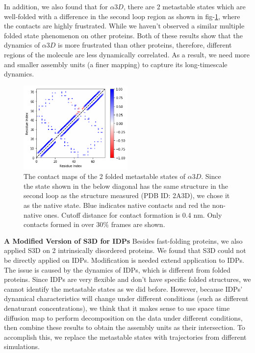 \documentclass[12pt]{article}
\begin{document}
\setlength{\parindent}{2em}

In addition, we also found that for $\alpha 3D$, there are 2 metastable states which are well-folded with a difference in the second loop region as shown in fig-\ref{A3D_contact}, where the contacts are highly frustrated\cite{Justin_frustration}. While we haven't observed a similar multiple folded state phenomenon on other proteins. Both of these results show that the dynamics of $\alpha 3D$ is more frustrated than other proteins, therefore, different regions of the molecule are less dynamically correlated. As a result, we need more and smaller assembly units (a finer mapping) to capture its long-timescale dynamics. 

\begin{figure}[htbp]
  \centering
  \includegraphics[width=0.5\textwidth]{A3D_contact_HMM_5_state_4_contacts.png}
  \caption{\label{A3D_contact}The contact maps of the 2 folded metastable states of $\alpha 3D$. Since the state shown in the below diagonal has the same structure in the second loop as the structure measured (PDB ID: 2A3D), we chose it as the native state. Blue indicates native contacts and red the non-native ones. Cutoff distance for contact formation is 0.4 nm. Only contacts formed in over $30\%$ frames are shown.}
\end{figure}

\setlength{\parindent}{0em}

{\bf A Modified Version of S3D for IDPs} Besides fast-folding proteins, we also applied S3D on 2 intrinsically disordered proteins. We found that S3D could not be directly applied on IDPs. Modification is needed extend application to IDPs. The issue is caused by the dynamics of IDPs, which is different from folded proteins. Since IDPs are very flexible and don't have specific folded structures\cite{IDP}, we cannot identify the metastable states as we did before\cite{IDP_dynamics}. However, because IDPs' dynamical characteristics will change under different conditions (such as different denaturant concentrations), we think that it makes sense to use space time diffusion map to perform decomposition on the data under different conditions, then combine these results to obtain the assembly units as their intersection. To accomplish this, we replace the metastable states with trajectories from different simulations.
\end{document}
